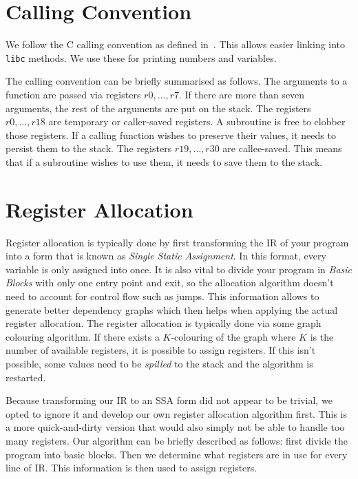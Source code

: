 \section{Calling Convention}

We follow the C calling convention as defined in~\cite{callingconvention}.
This allows easier linking into \texttt{libc} methods.
We use these for printing numbers and variables.

The calling convention can be briefly summarised as follows.
The arguments to a function are passed via registers $r0, \ldots, r7$.
If there are more than seven arguments, the rest of the arguments are put on the stack.
The registers $r0, \ldots, r18$ are temporary or caller-saved registers.
A subroutine is free to clobber those registers.
If a calling function wishes to preserve their values, it needs to persist them to the stack.
The registers $r19, \ldots, r30$ are callee-saved.
This means that if a subroutine wishes to use them, it needs to save them to the stack.

\section{Register Allocation}

Register allocation is typically done by first transforming the IR of your program into a form that is known as \emph{Single Static Assignment}.
In this format, every variable is only assigned into once.
It is also vital to divide your program in \emph{Basic Blocks} with only one entry point and exit, so the allocation algorithm doesn't need to account for control flow such as jumps.
This information allows to generate better dependency graphs which then helps when applying the actual register allocation.
The register allocation is typically done via some graph colouring algorithm.
If there exists a $K$-colouring of the graph where $K$ is the number of available registers, it is possible to assign registers.
If this isn't possible, some values need to be \emph{spilled} to the stack and the algorithm is restarted.

Because transforming our IR to an SSA form did not appear to be trivial, we opted to ignore it and develop our own register allocation algorithm first.
This is a more quick-and-dirty version that would also simply not be able to handle too many registers.
Our algorithm can be briefly described as follows: first divide the program into basic blocks.
Then we determine what registers are in use for every line of IR\@.
This information is then used to assign registers.

